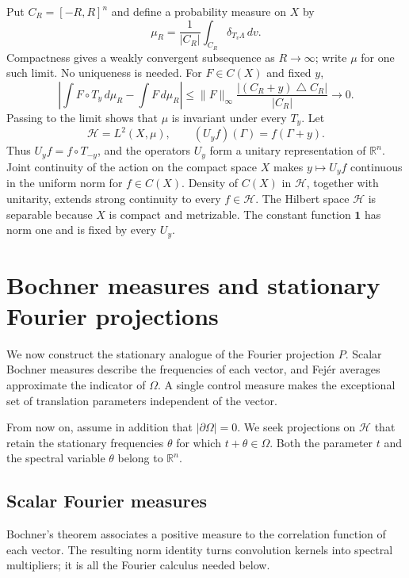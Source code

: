 \documentclass[a4paper,12pt,reqno]{amsart}
\newcommand{\lead}[1]{\par\smallskip\noindent\leavevmode#1\par\smallskip}
\theoremstyle{remark}
\numberwithin{equation}{section}
\newcommand{\R}{\mathbb R}
\newcommand{\Hh}{\mathcal H}
\newcommand{\one}{\mathbf 1}
\begin{document}
Put $C_R=[-R,R]^n$ and define a probability measure on $X$ by
\[
 \mu_R=\frac{1}{|C_R|}\int_{C_R}\delta_{T_v\Lambda}\,dv.
\]
Compactness gives a weakly convergent subsequence as $R\to\infty$;
write $\mu$ for one such limit. No uniqueness is needed. For
$F\in C(X)$ and fixed $y$,
\[
 \left|\int F\circ T_y\,d\mu_R-\int F\,d\mu_R\right|
 \leq\|F\|_\infty\frac{|(C_R+y)\mathbin\triangle C_R|}{|C_R|}
 \longrightarrow0.
\]
Passing to the limit shows that $\mu$ is invariant under every $T_y$.
Let
\begin{equation}\label{eq:U}
 \Hh=L^2(X,\mu),\qquad (U_yf)(\Gamma)=f(\Gamma+y).
\end{equation}
Thus $U_yf=f\circ T_{-y}$, and the operators $U_y$ form a unitary
representation of $\R^n$. Joint continuity of the action on the compact
space $X$ makes $y\mapsto U_yf$ continuous in the uniform norm for
$f\in C(X)$. Density of $C(X)$ in $\Hh$, together with unitarity,
extends strong continuity to every $f\in\Hh$. The Hilbert space $\Hh$
is separable because $X$ is compact and metrizable. The constant function
$\one$ has norm one and is fixed by every $U_y$.

\section{Bochner measures and stationary Fourier projections}\label{sec:bochner}

\lead{We now construct the stationary analogue of the Fourier projection
$P$. Scalar Bochner measures describe the frequencies of each vector, and
Fej\'er averages approximate the indicator of $\Omega$. A single control
measure makes the exceptional set of translation parameters independent
of the vector.}


From now on, assume in addition that $|\partial\Omega|=0$. We seek
projections on $\Hh$ that retain the stationary frequencies $\theta$
for which $t+\theta\in\Omega$. Both the parameter $t$ and the spectral
variable $\theta$ belong to $\R^n$.

\subsection{Scalar Fourier measures}

\lead{Bochner's theorem associates a positive measure to the correlation
function of each vector. The resulting norm identity turns convolution
kernels into spectral multipliers; it is all the Fourier calculus needed
below.}
\end{document}
